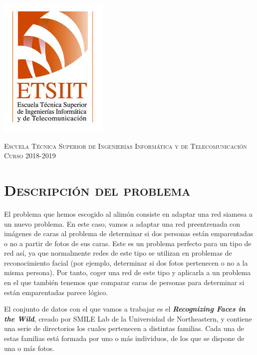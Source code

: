 \documentclass[11pt,a4paper]{article}
\begin{document}
\begin{titlepage}
\begin{minipage}{\textwidth}
\includegraphics[scale=0.3]{img/etsiit.jpeg}

\vspace{0.7cm}
\textsc{Escuela Técnica Superior de Ingenierías Informática y de Telecomunicación}\\
\vspace{1cm}
\textsc{Curso 2018-2019}
\end{minipage}
\end{titlepage}

\tableofcontents
\thispagestyle{empty}				%


\newpage

\setlength{\parskip}{1em}

\section{\textsc{Descripción del problema}}

El problema que hemos escogido al alimón consiste en adaptar una red siamesa a un nuevo problema.
En este caso, vamos a adaptar una red preentrenada con imágenes de caras al problema de determinar
si dos personas están emparentadas o no a partir de fotos de sus caras. Este es un problema perfecto
para un tipo de red así, ya que normalmente redes de este tipo se utilizan en problemas de reconocimiento
facial (por ejemplo, determinar si dos fotos pertenecen o no a la misma persona). Por tanto, coger una red
de este tipo y aplicarla a un problema en el que también tenemos que comparar caras de personas
para determinar si están emparentadas parece lógico.

El conjunto de datos con el que vamos a trabajar es el \textbf{\textit{Recognizing Faces in the Wild}},
creado por SMILE Lab de la Universidad de Northeastern, y contiene una serie de directorios los cuales
pertenecen a distintas familias. Cada una de estas familias está formada por uno o más individuos,
de los que se dispone de una o más fotos.
\end{document}
